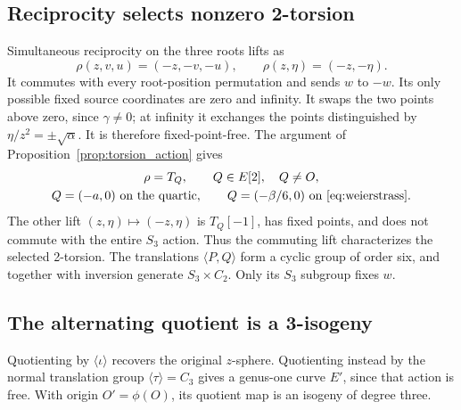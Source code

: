 \subsection{Reciprocity selects nonzero 2-torsion}
Simultaneous reciprocity on the three roots lifts as
\begin{equation}\label{eq:rho}
 \rho(z,v,u)=(-z,-v,-u),\qquad \rho(z,\eta)=(-z,-\eta).
\end{equation}
It commutes with every root-position permutation and sends \(w\) to \(-w\). Its only possible fixed source coordinates are zero and infinity. It swaps the two points above zero, since \(\gamma\ne0\); at infinity it exchanges the points distinguished by \(\eta/z^2=\pm\sqrt\alpha\). It is therefore fixed-point-free. The argument of Proposition~\ref{prop:torsion_action} gives
\begin{equation}\label{eq:Q}
 \begin{gathered}
 \rho=T_Q,\qquad Q\in E[2],\quad Q\ne O,\\
 Q=(-a,0)\ \text{on the quartic},\qquad
 Q=(-\beta/6,0)\ \text{on \eqref{eq:weierstrass}}.
 \end{gathered}
\end{equation}
The other lift \((z,\eta)\mapsto(-z,\eta)\) is \(T_Q[-1]\), has fixed points, and does not commute with the entire \(S_3\) action. Thus the commuting lift characterizes the selected 2-torsion. The translations \(\langle P,Q\rangle\) form a cyclic group of order six, and together with inversion generate \(S_3\times C_2\). Only its \(S_3\) subgroup fixes \(w\).

\subsection{The alternating quotient is a 3-isogeny}\label{sec:isogeny}
Quotienting by \(\langle\iota\rangle\) recovers the original \(z\)-sphere. Quotienting instead by the normal translation group \(\langle\tau\rangle=C_3\) gives a genus-one curve \(E'\), since that action is free. With origin \(O'=\phi(O)\), its quotient map is an isogeny of degree three.

